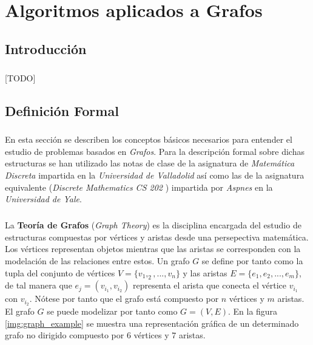 \documentclass{subfiles}
\begin{document}
  \chapter{Algoritmos aplicados a Grafos}
  \label{chap:graphs}

    \section{Introducción}
    \label{sec:graphs_intro}

      \paragraph{}
      [TODO]

    \section{Definición Formal}
    \label{sec:graph_formalism}

      \paragraph{}
      En esta sección se describen los conceptos básicos necesarios para entender el estudio de problemas basados en \emph{Grafos}. Para la descripción formal sobre dichas estructuras se han utilizado las notas de clase de la asignatura de \emph{Matemática Discreta} \cite{matematicaDiscreta2016notes} impartida en la \emph{Universidad de Valladolid} así como las de la asignatura equivalente (\emph{Discrete Mathematics CS 202} \cite{aspnes2013notes}) impartida por \emph{Aspnes} en la \emph{Universidad de Yale}.

      \paragraph{}
      La \textbf{Teoría de Grafos} (\emph{Graph Theory}) es la disciplina encargada del estudio de estructuras compuestas por vértices y aristas desde una persepectiva matemática. Los vértices representan objetos mientras que las aristas se corresponden con la modelación de las relaciones entre estos. Un grafo $G$ se define por tanto como la tupla del conjunto de vértices $V = \{ v_1, _2, ..., v_n \}$ y las aristas $E = \{ e_1, e_2, ..., e_m \}$, de tal manera que $e_j = (v_{i_1}, v_{i_2})$ representa el arista que conecta el vértice $v_{i_1}$ con $v_{i_2}$. Nótese por tanto que el grafo está compuesto por $n$ vértices y $m$ aristas. El grafo $G$ se puede modelizar por tanto como $G = (V, E)$. En la figura \ref{img:graph_example} se muestra una representación gráfica de un determinado grafo no dirigido compuesto por $6$ vértices y $7$ aristas.
\end{document}
